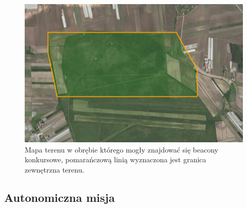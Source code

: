 \begin{figure}[!th]
    \centering
    \includegraphics[width=15cm]{zalaczniki/obrazy/teren.png}
    \caption{Mapa terenu w obrębie którego mogły znajdować się beacony konkursowe, pomarańczową linią wyznaczona jest granica zewnętrzna terenu.}
    \label{fig:teren}
\end{figure}

\subsection{Autonomiczna misja}

